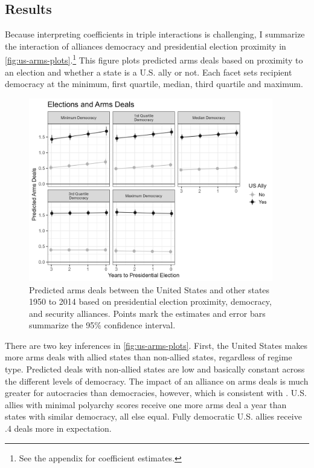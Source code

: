 \documentclass[12pt]{article}
\begin{document}
\subsection{Results}


Because interpreting coefficients in triple interactions is challenging, I summarize the interaction of alliances democracy and presidential election proximity in \autoref{fig:us-arms-plots}.\footnote{See the appendix for coefficient estimates.}
This figure plots predicted arms deals based on proximity to an election and whether a state is a U.S. ally or not. 
Each facet sets recipient democracy at the minimum, first quartile, median, third quartile and maximum.


\begin{figure}[htpb]
	\centering
		\includegraphics[width=0.95\textwidth]{../figures/us-arms-plots.png}
	\caption{Predicted arms deals between the United States and other states 1950 to 2014 based on presidential election proximity, democracy, and security alliances. Points mark the estimates and error bars summarize the 95\% confidence interval.}
	\label{fig:us-arms-plots}
\end{figure}


There are two key inferences in \autoref{fig:us-arms-plots}.
First, the United States makes more arms deals with allied states than non-allied states, regardless of regime type. 
Predicted deals with non-allied states are low and basically constant across the different levels of democracy. 
The impact of an alliance on arms deals is much greater for autocracies than democracies, however, which is consistent with \citep{McManusYarhi-Milo2017}. 
U.S. allies with minimal polyarchy scores receive one more arms deal a year than states with similar democracy, all else equal. 
Fully democratic U.S. allies receive .4 deals more in expectation. 
\end{document}
